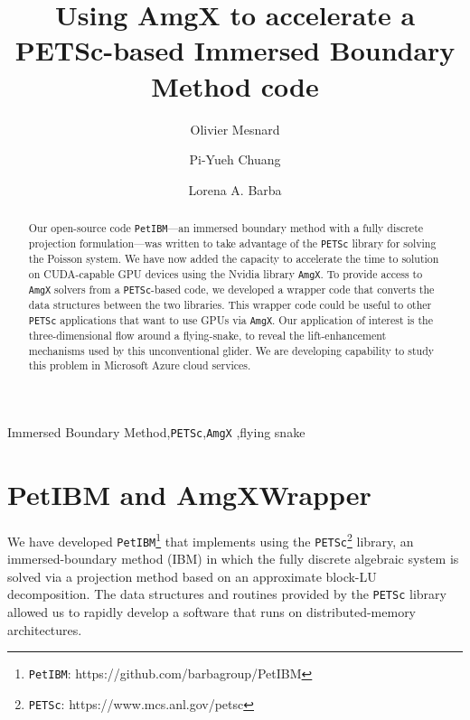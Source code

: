 \documentclass[review]{elsarticle}
\begin{document}
\begin{frontmatter}

\title{Using AmgX to accelerate a PETSc-based Immersed Boundary Method code}

\address[gwu]{Mechanical and Aerospace Engineering, The George Washington University, \\
Washington, DC, 20052, United-States}
\author[gwu]{Olivier Mesnard}
\author[gwu]{Pi-Yueh Chuang}
\author[gwu]{Lorena A. Barba}


\begin{abstract}
Our open-source code \texttt{PetIBM}---an immersed boundary method with a fully discrete projection formulation---was written to take advantage of the \texttt{PETSc} library for solving the Poisson system. 
We have now added the capacity to accelerate the time to solution on CUDA-capable GPU devices using the Nvidia library \texttt{AmgX}. 
To provide access to \texttt{AmgX} solvers from a \texttt{PETSc}-based code, we developed a wrapper code that converts the data structures between the two libraries.
This wrapper code could be useful to other \texttt{PETSc} applications that want to use GPUs via \texttt{AmgX}.
Our application of interest is the three-dimensional flow around a  flying-snake,  to reveal the lift-enhancement mechanisms used by this unconventional glider.
We are developing capability to study this problem in Microsoft Azure cloud services.
\end{abstract}

\begin{keyword}
Immersed Boundary Method\sep \texttt{PETSc}\sep \texttt{AmgX} \sep flying snake
\end{keyword}

\end{frontmatter}

\linenumbers

\section{PetIBM and AmgXWrapper}

We have developed \texttt{PetIBM}\footnote{\texttt{PetIBM}: https://github.com/barbagroup/PetIBM} that implements using the \texttt{PETSc}\footnote{\texttt{PETSc}: https://www.mcs.anl.gov/petsc} library, an immersed-boundary method (IBM) \cite{Taira_Colonius_2007} in which the fully discrete algebraic system is solved via a projection method based on an approximate block-LU decomposition.
The data structures and routines provided by the \texttt{PETSc} library allowed us to rapidly develop a software that runs on distributed-memory architectures.
\end{document}
